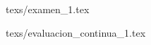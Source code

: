 \documentclass[11pt,fleqn]{book} %
\begin{document}
{texs/examen_1.tex}



{texs/evaluacion_continua_1.tex}







\end{document}
